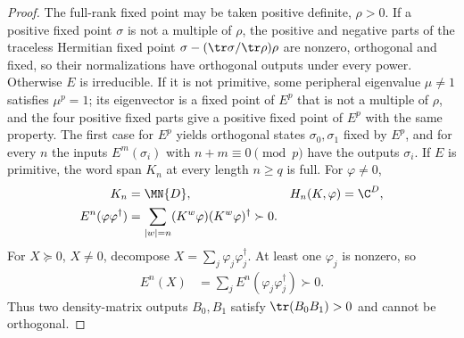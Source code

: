 \begin{proof}\leanok
    The full-rank fixed point may be taken positive definite, $\rho>0$. If a
    positive fixed point $\sigma$ is not a multiple of $\rho$, the positive
    and negative parts of the traceless Hermitian fixed point
    $\sigma-(\tr\sigma/\tr\rho)\rho$ are nonzero, orthogonal and fixed, so
    their normalizations have orthogonal outputs under every power.
    Otherwise $E$ is irreducible. If it is not primitive, some peripheral
    eigenvalue $\mu\neq1$ satisfies $\mu^p=1$; its eigenvector is a fixed
    point of $E^p$ that is not a multiple of $\rho$, and the four positive
    fixed parts give a positive fixed point of $E^p$ with the same property.
    The first case for $E^p$ yields orthogonal states $\sigma_0,\sigma_1$
    fixed by $E^p$, and for every $n$ the inputs $E^m(\sigma_i)$ with
    $n+m\equiv0\pmod p$ have the outputs $\sigma_i$. If $E$ is primitive, the
    word span $K_n$ at every length $n\ge q$ is full. For $\varphi\ne0$,
    \begin{align}
        K_n&=\MN{D}, & H_n(K,\varphi)&=\C^D,\\
        E^n(\varphi\varphi^\dagger)
          &=\sum_{|w|=n}(K^w\varphi)(K^w\varphi)^\dagger\succ0.
    \end{align}
    For $X\succeq0$, $X\ne0$, decompose $X=\sum_j\varphi_j\varphi_j^\dagger$.
    At least one $\varphi_j$ is nonzero, so
    \begin{align}
        E^n(X)&=\sum_j E^n(\varphi_j\varphi_j^\dagger)\succ0.
    \end{align}
    Thus two density-matrix outputs $B_0,B_1$ satisfy
    $\tr(B_0B_1)>0$ and cannot be orthogonal.
\end{proof}
